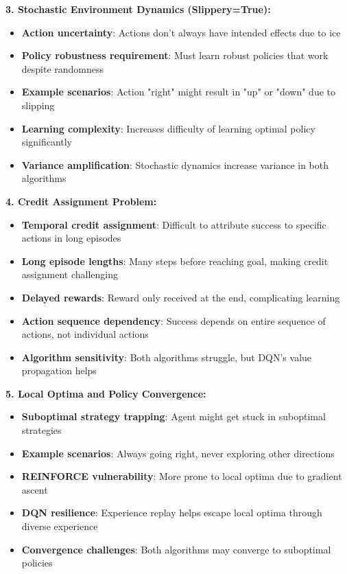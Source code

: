 \documentclass[12pt]{article}
\begin{document}
{{{\textbf{3. Stochastic Environment Dynamics (Slippery=True):}
\begin{itemize}
    \item \textbf{Action uncertainty}: Actions don't always have intended effects due to ice
    \item \textbf{Policy robustness requirement}: Must learn robust policies that work despite randomness
    \item \textbf{Example scenarios}: Action "right" might result in "up" or "down" due to slipping
    \item \textbf{Learning complexity}: Increases difficulty of learning optimal policy significantly
    \item \textbf{Variance amplification}: Stochastic dynamics increase variance in both algorithms
\end{itemize}

\textbf{4. Credit Assignment Problem:}
\begin{itemize}
    \item \textbf{Temporal credit assignment}: Difficult to attribute success to specific actions in long episodes
    \item \textbf{Long episode lengths}: Many steps before reaching goal, making credit assignment challenging
    \item \textbf{Delayed rewards}: Reward only received at the end, complicating learning
    \item \textbf{Action sequence dependency}: Success depends on entire sequence of actions, not individual actions
    \item \textbf{Algorithm sensitivity}: Both algorithms struggle, but DQN's value propagation helps
\end{itemize}

\textbf{5. Local Optima and Policy Convergence:}
\begin{itemize}
    \item \textbf{Suboptimal strategy trapping}: Agent might get stuck in suboptimal strategies
    \item \textbf{Example scenarios}: Always going right, never exploring other directions
    \item \textbf{REINFORCE vulnerability}: More prone to local optima due to gradient ascent
    \item \textbf{DQN resilience}: Experience replay helps escape local optima through diverse experience
    \item \textbf{Convergence challenges}: Both algorithms may converge to suboptimal policies
\end{itemize}

}}}
\end{document}
